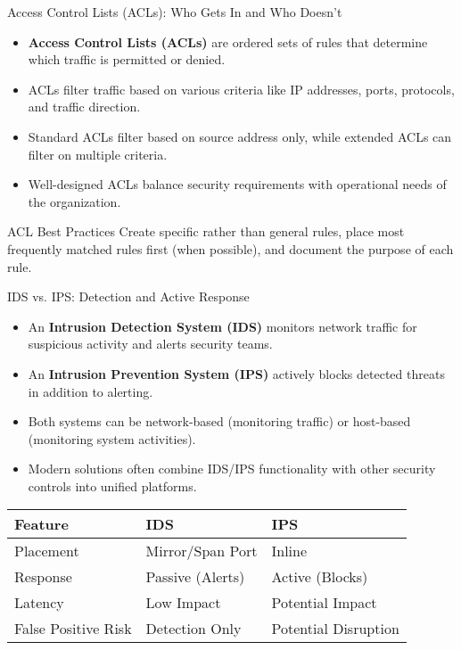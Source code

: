 \documentclass{beamer}
\begin{document}
\begin{frame}{Access Control Lists (ACLs): Who Gets In and Who Doesn't}
\begin{itemize}
\item \textbf{Access Control Lists (ACLs)} are ordered sets of rules that determine which traffic is permitted or denied.
\item ACLs filter traffic based on various criteria like IP addresses, ports, protocols, and traffic direction.
\item Standard ACLs filter based on source address only, while extended ACLs can filter on multiple criteria.
\item Well-designed ACLs balance security requirements with operational needs of the organization.
\end{itemize}

\begin{block}{ACL Best Practices}
Create specific rather than general rules, place most frequently matched rules first (when possible), and document the purpose of each rule.
\end{block}
\end{frame}

\begin{frame}{IDS vs. IPS: Detection and Active Response}
\begin{itemize}
\item An \textbf{Intrusion Detection System (IDS)} monitors network traffic for suspicious activity and alerts security teams.
\item An \textbf{Intrusion Prevention System (IPS)} actively blocks detected threats in addition to alerting.
\item Both systems can be network-based (monitoring traffic) or host-based (monitoring system activities).
\item Modern solutions often combine IDS/IPS functionality with other security controls into unified platforms.
\end{itemize}

\begin{tabular}{lll}
\textbf{Feature} & \textbf{IDS} & \textbf{IPS} \\
\hline
Placement & Mirror/Span Port & Inline \\
Response & Passive (Alerts) & Active (Blocks) \\
Latency & Low Impact & Potential Impact \\
False Positive Risk & Detection Only & Potential Disruption \\
\end{tabular}
\end{frame}
\end{document}
